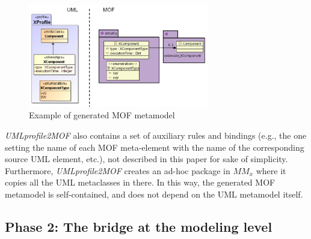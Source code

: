 %
\vspace{-.8cm}
\begin{figure}[htbp]
	\centering
		\includegraphics[width=0.70\textwidth]{figures/metamodelingExample.png}
	\caption{Example of generated MOF metamodel}
	\label{fig:metamodelingExample}
\end{figure}
\vspace{-.6cm}

\textit{UMLprofile2MOF} also contains a set of auxiliary rules and bindings (e.g., the one setting the name of each MOF meta-element with the name of the corresponding source UML element, etc.), not described in this paper for sake of simplicity. Furthermore, \textit{UMLprofile2MOF} creates an ad-hoc package in $MM_x$ where it copies all the UML metaclasses in there. In this way, the generated MOF metamodel is self-contained, and does not depend on the UML metamodel itself.

\vspace{-.2cm}
\subsection{Phase 2: The bridge at the modeling level}\label{sec:modeLevel}

